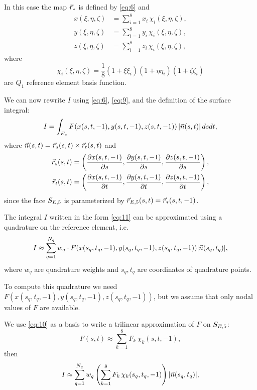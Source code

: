 \documentclass[11pt]{article}
\begin{document}
In this case the map $\vec r_{*}$ is defined by \eqref{eq:6} and
\begin{equation}
\label{eq:9}
\begin{aligned}
x(\xi,\eta,\zeta) &= \sum_{i=1}^{8} x_{i}\, \chi_{i}(\xi, \eta, \zeta),\\
y(\xi,\eta,\zeta) &= \sum_{i=1}^{8} y_{i}\, \chi_{i}(\xi, \eta, \zeta),\\
z(\xi,\eta,\zeta) &= \sum_{i=1}^{8} z_{i}\, \chi_{i}(\xi, \eta, \zeta),
\end{aligned}
\end{equation}
where
\begin{equation}
\label{eq:10}
\chi_{i}(\xi,\eta,\zeta) = \frac18 (1 + \xi\xi_{i})(1 + \eta\eta_{i})(1 + \zeta\zeta_{i})
\end{equation}
are $Q_{1}$ reference element basis function.

We can now rewrite $I$ using \eqref{eq:6}, \eqref{eq:9}, and the definition of the surface integral:
\begin{equation}
\label{eq:11}
I = \int_{E_{*}} F(x(s,t,-1), y(s,t,-1), z(s,t,-1))\, | \vec n(s,t) |\,dsdt,
\end{equation}
where $\vec n(s,t) = \vec r_{s}(s,t) \times \vec r_{t}(s,t)$ and
\begin{equation}
\label{eq:5}
\begin{aligned}
\vec r_{s}(s,t) &= \left(\frac{\partial x(s,t,-1)}{\partial s}, \frac{\partial y(s,t,-1)}{\partial s}, \frac{\partial z(s,t,-1)}{\partial s}\right),\\
\vec r_{t}(s,t) &= \left(\frac{\partial x(s,t,-1)}{\partial t}, \frac{\partial y(s,t,-1)}{\partial t}, \frac{\partial z(s,t,-1)}{\partial t}\right),
\end{aligned}
\end{equation}
since the face $S_{E,5}$ is parameterized by $\vec r_{E,5}(s, t) = \vec r_{*}(s, t, -1)$.

The integral $I$ written in the form \eqref{eq:11} can be approximated
using a quadrature on the reference element, i.e.
\begin{equation}
\label{eq:12}
I \approx \sum_{q=1}^{N_{q}} w_{q}\cdot F(x(s_{q},t_{q},-1), y(s_{q},t_{q},-1), z(s_{q},t_{q},-1)) | \vec n(s_{q},t_{q}) |,
\end{equation}
where $w_{q}$ are quadrature weights and $s_{q}, t_{q}$ are
coordinates of quadrature points.

To compute this quadrature we need
$F(x(s_{q},t_{q},-1), y(s_{q},t_{q},-1), z(s_{q},t_{q},-1))$, but we
assume that only nodal values of $F$ are available.

We use \eqref{eq:10} as a basis to write a trilinear approximation of $F$ on $S_{E,5}$:
\begin{equation}
\label{eq:14}
F(s,t) \approx \sum_{k=1}^{8} F_{k}\,\chi_{k}(s, t, -1),
\end{equation}
then
\begin{equation}
\label{eq:15}
I \approx \sum_{q=1}^{N_{q}} w_{q}\left( \sum_{k=1}^{8} F_{k}\,\chi_{k}(s_{q}, t_{q}, -1) \right) | \vec n(s_{q},t_{q}) |,
\end{equation}
\end{document}
